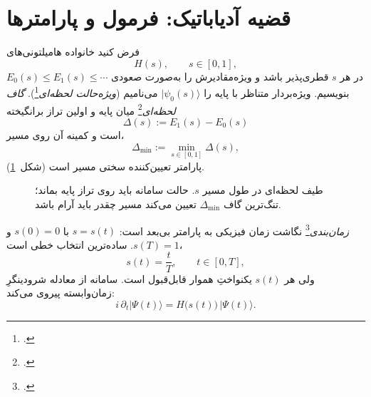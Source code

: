 \section{قضیه آدیاباتیک: فرمول و پارامترها}
\label{sec:adiabatic-theorem}

فرض کنید خانواده هامیلتونی‌های
\begin{equation}
	H(s),\qquad s\in[0,1],
\end{equation}
در هر $s$ قطری‌پذیر باشد و ویژه‌مقادیرش را به‌صورت صعودی $E_0(s)\le E_1(s)\le\cdots$ بنویسیم. ویژه‌بردار متناظر با پایه را $\lvert\psi_0(s)\rangle$ می‌نامیم (\emph{ویژه‌حالت لحظه‌ای}\footnote{.}). \emph{گاف لحظه‌ای}\footnote{.} میان پایه و اولین تراز برانگیخته
\begin{equation}
	\label{eq:gap}
	\Delta(s) := E_1(s)-E_0(s)
\end{equation}
است و کمینه آن روی مسیر،
\begin{equation}
	\Delta_{\min} := \min_{s\in[0,1]}\Delta(s),
\end{equation}
پارامتر تعیین‌کننده سختی مسیر است (شکل~\ref{fig:adiabatic-gap}).

\begin{figure}[htbp]
	\centering
	\begin{latin}
		\resizebox{0.92\textwidth}{!}{%
		}
	\end{latin}
	\caption{طیف لحظه‌ای در طول مسیر $s$. حالت سامانه باید روی تراز پایه بماند؛ تنگ‌ترین گاف $\Delta_{\min}$ تعیین می‌کند مسیر چقدر باید آرام باشد.}
	\label{fig:adiabatic-gap}
\end{figure}

\emph{زمان‌بندی}\footnote{.} نگاشت زمان فیزیکی به پارامتر بی‌بعد است: $s=s(t)$ با $s(0)=0$ و $s(T)=1$. ساده‌ترین انتخاب خطی است،
\begin{equation}
	s(t)=\frac{t}{T},\qquad t\in[0,T],
\end{equation}
ولی هر $s(t)$ یکنواختِ هموار قابل‌قبول است. سامانه از معادله شرودینگرِ زمان‌وابسته پیروی می‌کند:
\begin{equation}
	i\,\partial_t\lvert\Psi(t)\rangle = H\bigl(s(t)\bigr)\,\lvert\Psi(t)\rangle.
\end{equation}


